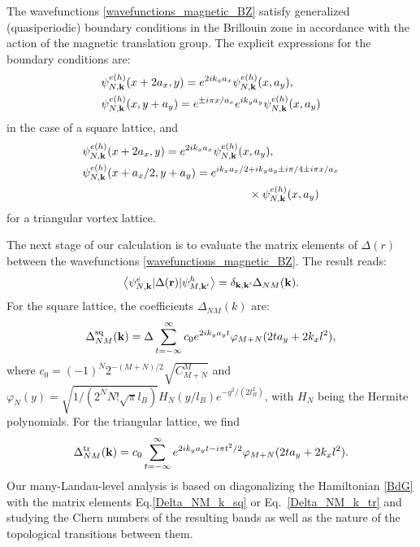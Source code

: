 \documentclass[10pt,prb,aps,superscriptaddress,amsmath,amssymb,twocolumn,floatfix,longbibliography]{revtex4-1}
\newcommand{\be}{\begin{equation} }
\newcommand{\ee}{\end{equation}}
\newcommand{\bk}{{\bf k}}
\newcommand{\br}{{\bf r}}
\begin{document}
The wavefunctions \eqref{wavefunctions_magnetic_BZ} satisfy generalized (quasiperiodic) boundary conditions in the Brillouin zone in accordance with the action of the magnetic translation group. The explicit expressions for the boundary conditions are:
\begin{subequations}
\label{psi_translations_sq}
\begin{align}
    & \psi_{N, \bk}^{e(h)} (x + 2 a_x, y) = e^{2 i k_x a_x} \psi_{N, \bk}^{e(h)} (x, a_y), \\ 
    & \psi_{N, \bk}^{e(h)} (x, y + a_y) = e^{\pm i \pi x / a_x} e^{i k_y a_y} \psi_{N, \bk}^{e(h)} (x, a_y)
\end{align}
\end{subequations}
in the case of a square lattice, and
\begin{subequations}
\label{psi_translations_triangular}
\begin{align}
    & \psi_{N, \bk}^{e(h)} (x + 2 a_x, y) = e^{2 i k_x a_x} \psi_{N, \bk}^{e(h)} (x, a_y), \\ 
    & \psi_{N, \bk}^{e(h)} (x + a_x / 2, y + a_y) = e^{i k_x a_x / 2 + i k_y a_y \pm i \pi /4 \pm i \pi x / a_x} \nonumber \\
    &  \qquad \qquad \qquad \qquad \qquad  \qquad \qquad \ \ \times\psi_{N, \bk}^{e(h)} (x, a_y)
\end{align}
\end{subequations}
for a triangular vortex lattice.



The next stage of our calculation is to evaluate the matrix elements of $\Delta(r)$ between the wavefunctions \eqref{wavefunctions_magnetic_BZ}. The result \cite{McDonald2} reads:
\be \label{Delta_Landau_basis}
	\left\langle \psi_{N,\bk}^e |\Delta(\br) | \psi_{M,\bk'}^h \right\rangle = \delta_{\bk, \bk'} \Delta_{NM} (\bk).
\ee
For the square lattice, the coefficients $\Delta_{NM}(k)$ are:
\be \label{Delta_NM_k_sq}
    \Delta_{NM}^{\text{sq}}(\bk) = \Delta  \sum_{t = -\infty}^{\infty} c_0 e^{2 i k_y a_y t} \varphi_{M + N}(2t a_y + 2k_x l^2),
\ee
where $c_0 = (-1)^N 2^{-(M+N)/2} \sqrt{C_{M+N}^M}$ and $\varphi_{N}(y)=\sqrt{1/(2^{N}N!\sqrt{\pi}l_B)} H_{N}(y / l_B)e^{-y^{2}/(2l_B^{2})}$, with $H_N$ being the Hermite polynomials. For the triangular lattice, we find
\be \label{Delta_NM_k_tr}
    \Delta_{NM}^{\text{tr}}(\bk) = c_0 \sum_{t = -\infty}^{\infty} e^{2 i k_y a_y t - i \pi t^2 / 2} \varphi_{M + N}(2t a_y + 2k_x l^2).
\ee
Our many-Landau-level analysis is based on diagonalizing the Hamiltonian \eqref{BdG} with the matrix elements Eq.\eqref{Delta_NM_k_sq} or Eq.~\eqref{Delta_NM_k_tr} and studying the Chern numbers of the resulting bands as well as the nature of the topological transitions between them. 
\end{document}
